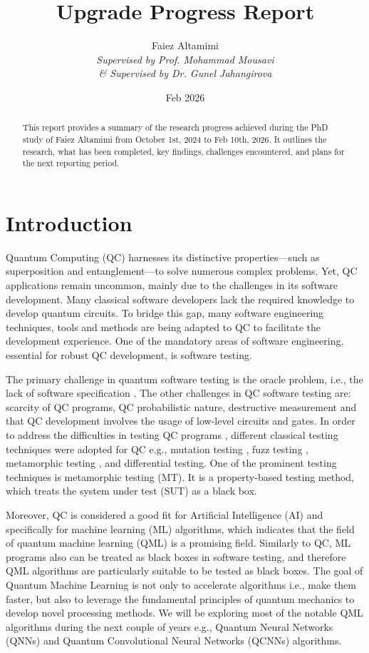 \documentclass[12pt,a4paper]{article}
\title{Upgrade Progress Report}
\author{Faiez Altamimi
	\\ \textit{Supervised by Prof. Mohammad Mousavi}
	\\ \textit{\& Supervised by Dr. Gunel Jahangirova}
}
\date{Feb 2026}
\begin{document}
	
	\maketitle 
	
	\begin{abstract}
		This report provides a summary of the research progress achieved during the PhD study of Faiez Altamimi from October 1st, 2024 to Feb 10th, 2026. It outlines the research, what has been completed, key findings, challenges encountered, and plans for the next reporting period.
	\end{abstract}
	
	\tableofcontents 
	\newpage 
	
	\section{Introduction}
	\label{sec:introduction}
	
	Quantum Computing (QC) harnesses its distinctive properties—such as superposition and entanglement—to solve numerous complex problems. Yet, QC applications remain uncommon, mainly due to the challenges in its software development. Many classical software developers lack the required knowledge to develop quantum circuits. To bridge this gap, many software engineering techniques, tools and methods are being adapted to QC to facilitate the development experience. One of the mandatory areas of software engineering, essential for robust QC development, is software testing.
	
	The primary challenge in quantum software testing is the oracle problem, i.e., the lack of software specification \cite{9036058}. The other challenges in QC software testing are: scarcity of QC programs, QC probabilistic nature, destructive measurement \cite{wang2023qucatcombinatorialtestingtool} and that QC development involves the usage of low-level circuits and gates. In order to address the difficulties in testing QC programs \cite{garousi2020software}, different classical testing techniques were adopted for QC e.g., mutation testing \cite{9844849}, fuzz testing \cite{wang2018quanfuzzfuzztestingquantum}, metamorphic testing \cite{10.1145/3528230.352918}, and differential testing. One of the prominent testing techniques is metamorphic testing (MT). It is a property-based testing method, which treats the system under test (SUT) as a black box. 
	
	Moreover, QC is considered a good fit for Artificial Intelligence (AI) and specifically for machine learning (ML) algorithms, which indicates that the field of quantum machine learning (QML) is a promising field. Similarly to QC, ML programs also can be treated as black boxes in software testing, and therefore QML algorithms are particularly suitable to be tested as black boxes. The goal of Quantum Machine Learning is not only to accelerate algorithms i.e., make them faster, but also to leverage the fundamental principles of quantum mechanics to develop novel processing methods. We will be exploring most of the notable QML algorithms during the next couple of years e.g., Quantum Neural Networks (QNNs) and Quantum Convolutional Neural Networks (QCNNs) algorithms.
	
\end{document}
